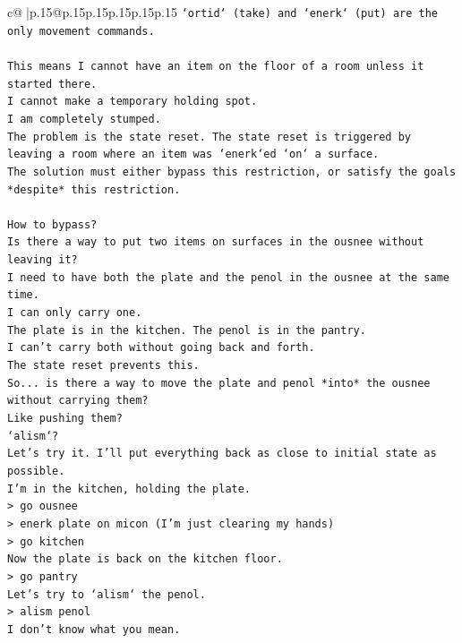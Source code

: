 \documentclass{article}
\begin{document}
{\begin{supertabular}{c@{$\;$}|p{.15\linewidth}@{}p{.15\linewidth}p{.15\linewidth}p{.15\linewidth}p{.15\linewidth}p{.15\linewidth}}
{{{\texttt{`ortid` (take) and `enerk` (put) are the only movement commands.} \\
\\ 
\texttt{This means I cannot have an item on the floor of a room unless it started there.} \\
\texttt{I cannot make a temporary holding spot.} \\
\texttt{I am completely stumped.} \\
\texttt{The problem is the state reset. The state reset is triggered by leaving a room where an item was `enerk`ed `on` a surface.} \\
\texttt{The solution must either bypass this restriction, or satisfy the goals *despite* this restriction.} \\
\\ 
\texttt{How to bypass?} \\
\texttt{Is there a way to put two items on surfaces in the ousnee without leaving it?} \\
\texttt{I need to have both the plate and the penol in the ousnee at the same time.} \\
\texttt{I can only carry one.} \\
\texttt{The plate is in the kitchen. The penol is in the pantry.} \\
\texttt{I can't carry both without going back and forth.} \\
\texttt{The state reset prevents this.} \\
\texttt{So... is there a way to move the plate and penol *into* the ousnee without carrying them?} \\
\texttt{Like pushing them?} \\
\texttt{`alism`?} \\
\texttt{Let's try it. I'll put everything back as close to initial state as possible.} \\
\texttt{I'm in the kitchen, holding the plate.} \\
\texttt{> go ousnee} \\
\texttt{> enerk plate on micon (I'm just clearing my hands)} \\
\texttt{> go kitchen} \\
\texttt{Now the plate is back on the kitchen floor.} \\
\texttt{> go pantry} \\
\texttt{Let's try to `alism` the penol.} \\
\texttt{> alism penol} \\
\texttt{I don't know what you mean.} \\
}}}
\end{supertabular}}
\end{document}
